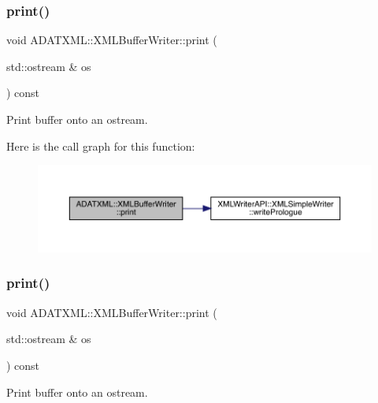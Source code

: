 \subsubsection{\texorpdfstring{print()}{print()}\hspace{0.1cm}{\footnotesize\ttfamily [1/2]}}
{\footnotesize\ttfamily void A\+D\+A\+T\+X\+M\+L\+::\+X\+M\+L\+Buffer\+Writer\+::print (\begin{DoxyParamCaption}\item[{std\+::ostream \&}]{os }\end{DoxyParamCaption}) const}



Print buffer onto an ostream. 

Here is the call graph for this function\+:\nopagebreak
\begin{figure}[H]
\begin{center}
\leavevmode
\includegraphics[width=350pt]{d7/de9/classADATXML_1_1XMLBufferWriter_a1256054ea792711a5ff2807afd4f6404_cgraph}
\end{center}
\end{figure}
\mbox{\label{classADATXML_1_1XMLBufferWriter_a1256054ea792711a5ff2807afd4f6404}} 
\subsubsection{\texorpdfstring{print()}{print()}\hspace{0.1cm}{\footnotesize\ttfamily [2/2]}}
{\footnotesize\ttfamily void A\+D\+A\+T\+X\+M\+L\+::\+X\+M\+L\+Buffer\+Writer\+::print (\begin{DoxyParamCaption}\item[{std\+::ostream \&}]{os }\end{DoxyParamCaption}) const}



Print buffer onto an ostream. 

\mbox{\label{classADATXML_1_1XMLBufferWriter_a5eca1ff89009128d84add6150375a621}} 
